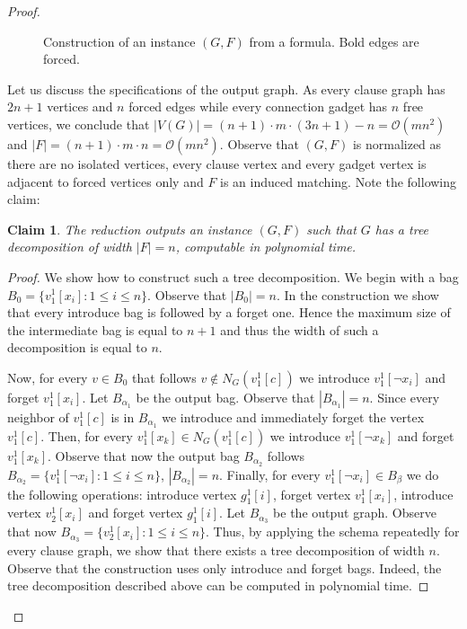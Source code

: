 \documentclass[en]{pracamgr}
\newtheorem{claim}{Claim}
\theoremstyle{definition}
\begin{document}
\begin{proof}
\begin{figure}
		\caption{Construction of an instance $(G,F)$ from a formula. Bold edges are forced.}
		\label{fig2}
	\end{figure}
	
	Let us discuss the specifications of the output graph. As every clause graph has $2n+1$ vertices and $n$ forced edges while every connection gadget has $n$ free vertices, we conclude that $|V(G)| = (n+1) \cdot m \cdot (3n+1) -n= \mathcal{O}(mn^2)$ and $|F|=(n+1) \cdot m \cdot n= \mathcal{O}(mn^2)$. Observe that $(G,F)$ is normalized as there are no isolated vertices, every clause vertex and every gadget vertex is adjacent to forced vertices only and $F$ is an induced matching. Note the following claim:
	
	\begin{claim}
		The reduction outputs an instance $(G,F)$ such that $G$ has a tree decomposition of width $|F|=n$, computable in polynomial time.
	\end{claim}

	\begin{proof}
		We show how to construct such a tree decomposition. We begin with a bag $B_0=\{v^1_1[x_i]: 1 \leq i \leq n\}$. Observe that $|B_0|=n$. In the construction we show that every introduce bag is followed by a forget one. Hence the maximum size of the intermediate bag is equal to $n+1$ and thus the width of such a decomposition is equal to $n$. 
		
		Now, for every $v \in B_0$ that follows $v \notin N_G(v^1_1[c])$ we introduce $v^1_1[\neg x_i]$ and forget $v^1_1[x_i]$. Let $B_{\alpha_1}$ be the output bag. Observe that $|B_{\alpha_1}|=n$. Since every neighbor of $v^1_1[c]$ is in $B_{\alpha_1}$ we introduce and immediately forget the vertex $v^1_1[c]$. Then, for every $v^1_1[x_k] \in N_G(v^1_1[c])$ we introduce $v^1_1[\neg x_k]$ and forget $v^1_1[x_k]$. Observe that now the output bag $B_{\alpha_2}$ follows $B_{\alpha_2} = \{v^1_1[\neg x_i]: 1 \leq i \leq n\}$, $|B_{\alpha_2}|=n$. Finally, for every $v^1_1[\neg x_i] \in B_\beta$ we do the following operations: introduce vertex $g^1_1[i]$, forget vertex $v^1_1[x_i]$, introduce vertex $v^1_2[x_i]$ and forget vertex $g^1_1[i]$. Let $B_{\alpha_3}$ be the output graph. Observe that now $B_{\alpha_3} = \{v^1_2[x_i]: 1 \leq i \leq n\}$. Thus, by applying the schema repeatedly for every clause graph, we show that there exists a tree decomposition of width $n$. Observe that the construction uses only introduce and forget bags. Indeed, the tree decomposition described above can be computed in polynomial time.
	\end{proof}
	

\end{proof}
\end{document}
